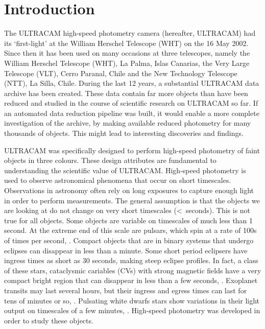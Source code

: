 \section{Introduction} 

The ULTRACAM high-speed photometry camera (hereafter, ULTRACAM) had its `first-light' at the William Herschel Telescope (WHT) on the 16 May 2002. Since then it has been used on many occasions at three telescopes, namely the William Herschel Telescope (WHT), La Palma, Islas Canarias, the Very Large Telescope (VLT), Cerro Paranal, Chile and the New Technology Telescope (NTT), La Silla, Chile. During the last 12 years, a substantial ULTRACAM data archive has been created. These data contain far more objects than have been reduced  and studied in the course of scientific research on ULTRACAM so far. If an automated data reduction pipeline was built, it would enable a more complete investigation of the archive, by making available reduced photometry for many thousands of objects. This might lead to interesting discoveries and findings. 

ULTRACAM was specifically designed to perform high-speed photometry of faint objects in three colours. These design attributes are fundamental to understanding the scientific value of ULTRACAM.  High-speed photometry is used to observe astronomical phenomena that occur on short timescales. Observations in astronomy often rely on long exposures to capture enough light in order to perform measurements. The general assumption is that the objects we are looking at do not change on very short timescales (\textless~seconds). This is not true for all objects. Some objects are variable on timescales of much less than 1 second. At the extreme end of this scale are pulsars, which spin at a rate of 100s of times per second, \citep{pulsarreview}. Compact objects that are in binary systems that undergo eclipses can disappear in less than a minute. Some short period eclipsers have ingress times as short as 30 seconds, making steep eclipse profiles. In fact, a class of these stars, cataclysmic cariables (CVs) with strong magnetic fields have a very compact bright region that can disappear in less than a few seconds, \citep{WarnerBook}. Exoplanet transits may last several hours, but their ingress and egress times can last for tens of minutes or so, \citep{exoplanettransits}. Pulsating white dwarfs stars show variations in their light output on timescales of a few minutes, \citep{wingetreview}.  High-speed photometry was developed in order to study these objects. 

